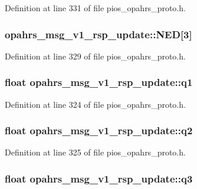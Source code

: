 Definition at line 331 of file pios\-\_\-opahrs\-\_\-proto.\-h.

\hypertarget{structopahrs__msg__v1__rsp__update_ac3dbe3978be0c288adc18321145c9267}{
\subsubsection[{N\-E\-D}]{ opahrs\-\_\-msg\-\_\-v1\-\_\-rsp\-\_\-update\-::\-N\-E\-D\mbox{[}3\mbox{]}}}\label{structopahrs__msg__v1__rsp__update_ac3dbe3978be0c288adc18321145c9267}


Definition at line 329 of file pios\-\_\-opahrs\-\_\-proto.\-h.

\hypertarget{structopahrs__msg__v1__rsp__update_a8e433149205c625f82cb308658580d30}{
\subsubsection[{q1}]{\setlength{\rightskip}{0pt plus 5cm}float opahrs\-\_\-msg\-\_\-v1\-\_\-rsp\-\_\-update\-::q1}}\label{structopahrs__msg__v1__rsp__update_a8e433149205c625f82cb308658580d30}


Definition at line 324 of file pios\-\_\-opahrs\-\_\-proto.\-h.

\hypertarget{structopahrs__msg__v1__rsp__update_a0e734adc08d321d16c95c4e03570c01e}{
\subsubsection[{q2}]{\setlength{\rightskip}{0pt plus 5cm}float opahrs\-\_\-msg\-\_\-v1\-\_\-rsp\-\_\-update\-::q2}}\label{structopahrs__msg__v1__rsp__update_a0e734adc08d321d16c95c4e03570c01e}


Definition at line 325 of file pios\-\_\-opahrs\-\_\-proto.\-h.

\hypertarget{structopahrs__msg__v1__rsp__update_ade6006cf35c2d851d58e3c9476543aea}{
\subsubsection[{q3}]{\setlength{\rightskip}{0pt plus 5cm}float opahrs\-\_\-msg\-\_\-v1\-\_\-rsp\-\_\-update\-::q3}}\label{structopahrs__msg__v1__rsp__update_ade6006cf35c2d851d58e3c9476543aea}


